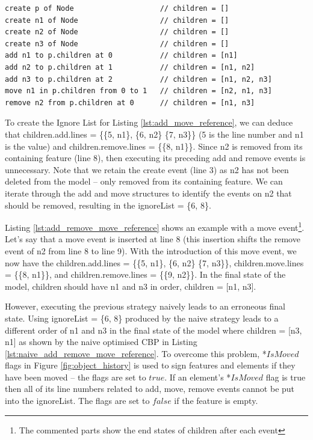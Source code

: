 {\begin{lstlisting}[style=eol,caption={A CBP representation of add, move, and remove operations.},label=lst:add_remove_move_reference]
create p of Node                    // children = []          
create n1 of Node                   // children = []         
create n2 of Node                   // children = []         
create n3 of Node                   // children = []
add n1 to p.children at 0           // children = [n1]
add n2 to p.children at 1           // children = [n1, n2]
add n3 to p.children at 2           // children = [n1, n2, n3]
move n1 in p.children from 0 to 1   // children = [n2, n1, n3] 
remove n2 from p.children at 0      // children = [n1, n3]
\end{lstlisting}

To create the Ignore List for Listing \ref{lst:add_move_reference}, we can deduce that \textsf{children}.\textsf{add}.\textsf{lines} = \{\{5, \textsf{n1}\}, \{6, \textsf{n2}\} \{7, \textsf{n3}\}\} (5 is the line number and \textsf{n1} is the value) and \textsf{children}.\textsf{remove}.\textsf{lines} = \{\{8, \textsf{n1}\}\}. Since \textsf{n2} is removed from its containing feature (line 8), then executing its preceding add and remove events is unnecessary. Note that we retain the \textsf{create} event (line 3) as \textsf{n2} has not been deleted from the model -- only removed from its containing feature. We can iterate through the add and move structures to identify the events on \textsf{n2} that should be removed, resulting in the \textsf{ignoreList} = \{6, 8\}.

Listing \ref{lst:add_remove_move_reference} shows an example with a \textsf{move} event\footnote{The commented parts  show the end states of \textsf{children} after each event}. Let's say that a \textsf{move} event is inserted at line 8 (this insertion shifts the \textsf{remove} event of \textsf{n2} from line 8 to line 9). With the introduction of this \textsf{move} event, we now have the \textsf{children}.\textsf{add}.\textsf{lines} = \{\{5, \textsf{n1}\}, \{6, \textsf{n2}\} \{7, \textsf{n3}\}\}, \textsf{children}.\textsf{move}.\textsf{lines} = \{\{8, \textsf{n1}\}\}, and \textsf{children}.\textsf{remove}.\textsf{lines} = \{\{9, \textsf{n2}\}\}. In the final state of the model, \textsf{children} should have \textsf{n1} and \textsf{n3} in order, \textsf{children} = [n1, n3].  

However, executing the previous strategy naively leads to an erroneous final state. Using \textsf{ignoreList} = \{6, 8\} produced by the naive strategy leads to a different order of \textsf{n1} and \textsf{n3} in the final state of the model where \textsf{children} = [n3, n1] as shown by the naive optimised CBP in Listing \ref{lst:naive_add_remove_move_reference}. To overcome this problem, *$IsMoved$ flags in Figure \ref{fig:object_history} is used to sign  features and elements if they have been moved -- the flags are set to $true$. If an element's *$IsMoved$ flag is true then all of its line numbers related to \textsf{add}, \textsf{move}, \textsf{remove} events cannot be put into the \textsf{ignoreList}. The flags are set to $false$ if the feature is empty. 

}
